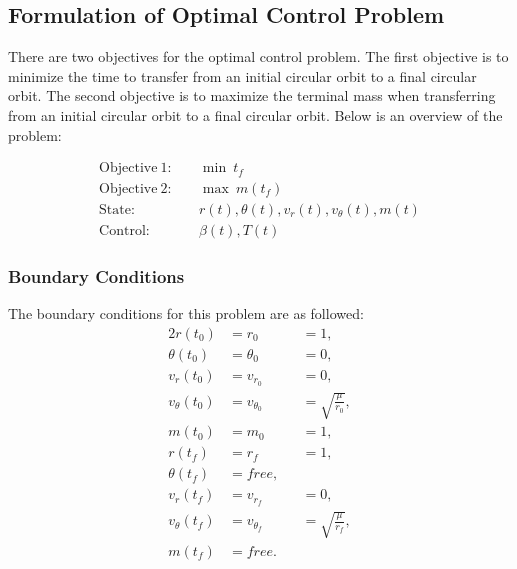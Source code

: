 \documentclass[]{article}
\begin{document}
	\subsection{Formulation of Optimal Control Problem}
	There are two objectives for the optimal control problem. The first objective is to minimize the time to transfer from an initial circular orbit to a final circular orbit. The second objective is to maximize the terminal mass when transferring from an initial circular orbit to a final circular orbit. Below is an overview of the problem:

	\begin{align*}
		\mathrm{Objective \ 1}:& \quad \min\ t_f \\
		\mathrm{Objective \ 2}:& \quad \max\ m(t_f) \\
		\mathrm{State}:&     \quad r(t), \theta(t), v_r(t), v_\theta(t), m(t) \\
		\mathrm{Control}:&   \quad \beta(t), T(t)
	\end{align*}
	\subsubsection{Boundary Conditions}
	The boundary conditions for this problem are as followed:
	\begin{alignat*}{2}                                                                                                                                                                        
		r(t_0)          &= r_0          &  &= 1, \\
		\theta(t_0)     &= \theta_0     &  &= 0, \\
		v_r(t_0)        &= v_{r_0}      &  &= 0, \\
		v_{\theta}(t_0) &= v_{\theta_0} &  &= \sqrt{\frac{\mu}{r_0}}, \\
		m(t_0)          &= m_0          &  &= 1,\\
		r(t_f)          &= r_f          &  &= 1,\\
		\theta(t_f)     &= free,        &  & \\
		v_r(t_f)        &= v_{r_f}      &  &= 0, \\
		v_{\theta}(t_f) &= v_{\theta_f} &  &=\sqrt{\frac{\mu}{r_f}},\\
		m(t_f)          &= free.         &  & 
	\end{alignat*}
\end{document}
